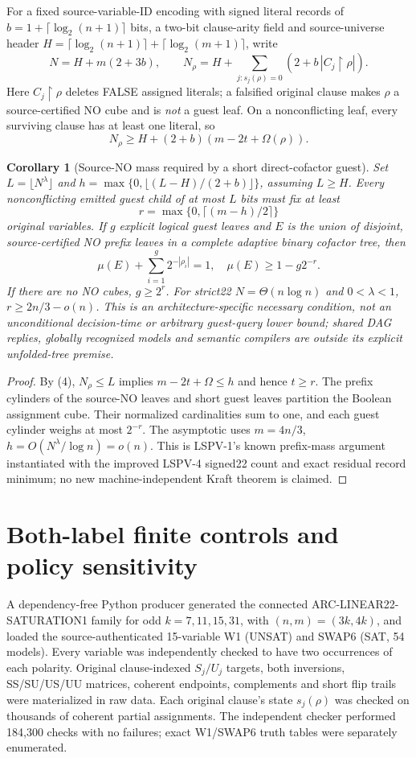 \documentclass[10pt]{article}
\newtheorem{corollary}{Corollary}
\begin{document}
For a fixed source-variable-ID encoding with signed literal records of $b=1+\lceil\log_2(n+1)\rceil$ bits, a two-bit clause-arity field and source-universe header $H=\lceil\log_2(n+1)\rceil+\lceil\log_2(m+1)\rceil$, write
\[
 N=H+m(2+3b),\qquad N_\rho=H+\sum_{j:s_j(\rho)=0}(2+b\,|C_j\!\restriction\!\rho|).
\tag{3}
\]
Here $C_j\restriction\rho$ deletes FALSE assigned literals; a falsified original clause makes $\rho$ a source-certified NO cube and is \emph{not} a guest leaf. On a nonconflicting leaf, every surviving clause has at least one literal, so
\[
 N_\rho\ge H+(2+b)(m-2t+\Omega(\rho)).
\tag{4}
\]
\begin{corollary}[Source-NO mass required by a short direct-cofactor guest]
Set $L=\lfloor N^\lambda\rfloor$ and $h=\max\{0,\lfloor(L-H)/(2+b)\rfloor\}$, assuming $L\ge H$. Every nonconflicting emitted guest child of at most $L$ bits must fix at least
\[
 \boxed{r=\max\{0,\lceil(m-h)/2\rceil\}}
\tag{5}
\]
original variables. If $g$ explicit logical guest leaves and $E$ is the union of disjoint, source-certified NO prefix leaves in a complete adaptive binary cofactor tree, then
\[
 \boxed{\mu(E)+\sum_{i=1}^g2^{-|\rho_i|}=1,\quad \mu(E)\ge1-g2^{-r}.}
\tag{6}
\]
If there are no NO cubes, $g\ge2^r$. For strict22 $N=\Theta(n\log n)$ and $0<\lambda<1$, $r\ge 2n/3-o(n)$. This is an architecture-specific necessary condition, not an unconditional decision-time or arbitrary guest-query lower bound; shared DAG replies, globally recognized models and semantic compilers are outside its explicit unfolded-tree premise.
\end{corollary}
\begin{proof}
By (4), $N_\rho\le L$ implies $m-2t+\Omega\le h$ and hence $t\ge r$. The prefix cylinders of the source-NO leaves and short guest leaves partition the Boolean assignment cube. Their normalized cardinalities sum to one, and each guest cylinder weighs at most $2^{-r}$. The asymptotic uses $m=4n/3$, $h=O(N^\lambda/\log n)=o(n)$. This is LSPV-1's known prefix-mass argument instantiated with the improved LSPV-4 signed22 count and exact residual record minimum; no new machine-independent Kraft theorem is claimed.\end{proof}

\section{Both-label finite controls and policy sensitivity}
A dependency-free Python producer generated the connected ARC-LINEAR22-SATURATION1 family for odd $k=7,11,15,31$, with $(n,m)=(3k,4k)$, and loaded the source-authenticated 15-variable W1 (UNSAT) and SWAP6 (SAT, 54 models). Every variable was independently checked to have two occurrences of each polarity. Original clause-indexed $S_j/U_j$ targets, both inversions, SS/SU/US/UU matrices, coherent endpoints, complements and short flip trails were materialized in raw data. Each original clause's state $s_j(\rho)$ was checked on thousands of coherent partial assignments. The independent checker performed 184,300 checks with no failures; exact W1/SWAP6 truth tables were separately enumerated.
\end{document}
